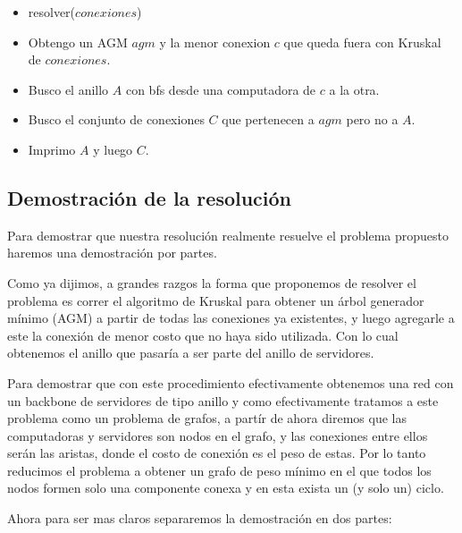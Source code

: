 \begin{itemize}
\item resolver($conexiones$)
\item Obtengo un AGM $agm$ y la menor conexion $c$ que queda fuera con Kruskal de $conexiones$.
\item Busco el anillo $A$ con bfs desde una computadora de $c$ a la otra.
\item Busco el conjunto de conexiones $C$ que pertenecen a $agm$ pero no a $A$.
\item Imprimo $A$ y luego $C$.
\end{itemize}


\newpage


\subsection{Demostraci\'on de la resoluci\'on}

Para demostrar que nuestra resoluci\'on realmente resuelve el problema propuesto haremos una demostraci\'on por partes.

Como ya dijimos, a grandes razgos la forma que proponemos de resolver el problema es correr el algoritmo de Kruskal para obtener un \'arbol generador mínimo (AGM) a partir de todas las conexiones ya existentes, y luego agregarle a este la conexión de menor costo que no haya sido utilizada. Con lo cual obtenemos el anillo que pasaría a ser parte del anillo de servidores.

Para demostrar que con este procedimiento efectivamente obtenemos una red con un backbone de servidores de tipo anillo y como efectivamente tratamos a este problema como un problema de grafos, a part\'ir de ahora diremos que las computadoras y servidores son nodos en el grafo, y las conexiones entre ellos serán las aristas, donde el costo de conexión es el peso de estas. Por lo tanto reducimos el problema a obtener un grafo de peso mínimo en el que todos los nodos formen solo una componente conexa y en esta exista un (y solo un) ciclo.

Ahora para ser mas claros separaremos la demostraci\'on en dos partes:

